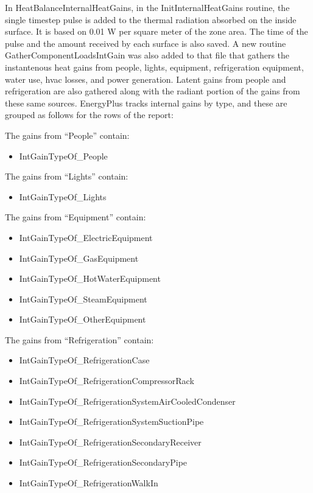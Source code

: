 In HeatBalanceInternalHeatGains, in the InitInternalHeatGains routine, the single timestep pulse is added to the thermal radiation absorbed on the inside surface. It is based on 0.01 W per square meter of the zone area. The time of the pulse and the amount received by each surface is also saved. A new routine GatherComponentLoadsIntGain was also added to that file that gathers the instantenous heat gains from people, lights, equipment, refrigeration equipment, water use, hvac losses, and power generation. Latent gains from people and refrigeration are also gathered along with the radiant portion of the gains from these same sources. EnergyPlus tracks internal gains by type, and these are grouped as follows for the rows of the report:

The gains from ``People'' contain:

\begin{itemize}
\tightlist
\item
  IntGainTypeOf\_People
\end{itemize}

The gains from ``Lights'' contain:

\begin{itemize}
\tightlist
\item
  IntGainTypeOf\_Lights
\end{itemize}

The gains from ``Equipment'' contain:

\begin{itemize}
\item
  IntGainTypeOf\_ElectricEquipment
\item
  IntGainTypeOf\_GasEquipment
\item
  IntGainTypeOf\_HotWaterEquipment
\item
  IntGainTypeOf\_SteamEquipment
\item
  IntGainTypeOf\_OtherEquipment
\end{itemize}

The gains from ``Refrigeration'' contain:

\begin{itemize}
\item
  IntGainTypeOf\_RefrigerationCase
\item
  IntGainTypeOf\_RefrigerationCompressorRack
\item
  IntGainTypeOf\_RefrigerationSystemAirCooledCondenser
\item
  IntGainTypeOf\_RefrigerationSystemSuctionPipe
\item
  IntGainTypeOf\_RefrigerationSecondaryReceiver
\item
  IntGainTypeOf\_RefrigerationSecondaryPipe
\item
  IntGainTypeOf\_RefrigerationWalkIn
\end{itemize}

